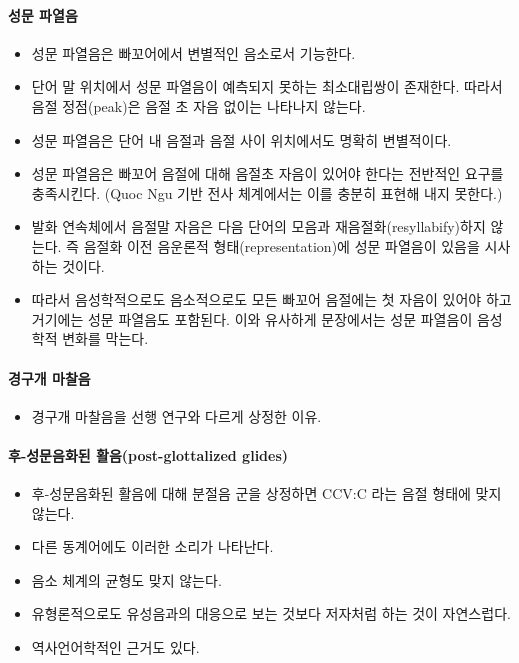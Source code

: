 \paragraph{성문 파열음}
\begin{itemize}
\item 성문 파열음은 빠꼬어에서 변별적인 음소로서 기능한다. 
\item 단어 말 위치에서 성문 파열음이 예측되지 못하는 최소대립쌍이 존재한다. 따라서 음절 정점(peak)은 음절 초 자음 없이는 나타나지 않는다. 
\item 성문 파열음은 단어 내 음절과 음절 사이 위치에서도 명확히 변별적이다. 
\item 성문 파열음은 빠꼬어 음절에 대해 음절초 자음이 있어야 한다는 전반적인 요구를 충족시킨다. (Quoc Ngu 기반 전사 체계에서는 이를 충분히 표현해 내지 못한다.)
\item 발화 연속체에서 음절말 자음은 다음 단어의 모음과 재음절화(resyllabify)하지 않는다. 즉 음절화 이전 음운론적 형태(representation)에 성문 파열음이 있음을 시사하는 것이다.
\item 따라서 음성학적으로도 음소적으로도 모든 빠꼬어 음절에는 첫 자음이 있어야 하고 거기에는 성문 파열음도 포함된다. 이와 유사하게 문장에서는 성문 파열음이 음성학적 변화를 막는다.
\end{itemize}

\paragraph{경구개 마찰음}
\begin{itemize}
\item 경구개 마찰음을 선행 연구와 다르게 상정한 이유. \omission
\end{itemize}

\paragraph{후-성문음화된 활음(post-glottalized glides)}
\begin{itemize}
\item 후-성문음화된 활음에 대해 분절음 군을 상정하면 CCV:C 라는 음절 형태에 맞지 않는다.
\item 다른 동계어에도 이러한 소리가 나타난다.
\item 음소 체계의 균형도 맞지 않는다.
\item 유형론적으로도 유성음과의 대응으로 보는 것보다 저자처럼 하는 것이 자연스럽다.
\item 역사언어학적인 근거도 있다.
\end{itemize}

